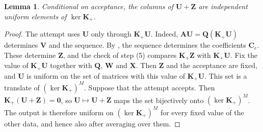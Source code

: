 \documentclass[b5paper, 10pt, abstract=true, captions=tableheading]{scrartcl}
\theoremstyle{plain}
\newtheorem{lemma}{Lemma}
\theoremstyle{definition}
\newcommand{\mat}[1]{\symbf{#1}}
\begin{document}
\begin{lemma}\label{lem:wiedemann-uniform}
Conditional on acceptance, the columns of $\mat U+\mat Z$ are independent
uniform elements of $\ker\mat K_+$.
\end{lemma}
\begin{proof}
The attempt uses $\mat U$ only through $\mat K_+\mat U$. Indeed,
$\mat A\mat U=\mat Q(\mat K_+\mat U)$ determines $\mat V$ and the
sequence. By , the sequence determines
the coefficients $\mat C_e$. These determine $\mat Z$, and the check of
step (5) compares $\mat K_+\mat Z$ with $\mat K_+\mat U$. Fix the
value of $\mat K_+\mat U$ together with $\mat Q$, $\mat W$ and $\mat X$.
Then $\mat Z$ and the acceptance are fixed, and $\mat U$ is uniform on the
set of matrices with this value of $\mat K_+\mat U$. This set is a translate of
$(\ker\mat K_+)^M$. Suppose that the attempt accepts. Then
$\mat K_+(\mat U+\mat Z)=\mat 0$, so $\mat U\mapsto\mat U+\mat Z$ maps the
set bijectively onto $(\ker\mat K_+)^M$. The output is therefore uniform
on $(\ker\mat K_+)^M$ for every fixed value of the other data, and hence
also after averaging over them.
\end{proof}
\end{document}
